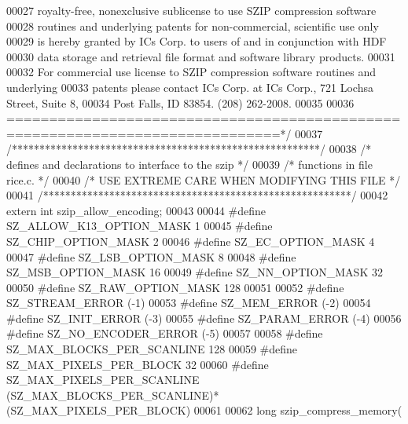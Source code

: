 \begin{DoxyCode}
00027 \textcolor{comment}{royalty-free, nonexclusive sublicense to use SZIP compression software }
00028 \textcolor{comment}{routines and underlying patents for non-commercial, scientific use only }
00029 \textcolor{comment}{is hereby granted by ICs Corp. to users of and in conjunction with HDF }
00030 \textcolor{comment}{data storage and retrieval file format and software library products.}
00031 \textcolor{comment}{}
00032 \textcolor{comment}{For commercial use license to SZIP compression software routines and underlying }
00033 \textcolor{comment}{patents please contact ICs Corp. at ICs Corp., 721 Lochsa Street, Suite 8,}
00034 \textcolor{comment}{Post Falls, ID 83854.  (208) 262-2008.}
00035 \textcolor{comment}{}
00036 \textcolor{comment}{==============================================================================*/}
00037 \textcolor{comment}{/********************************************************/}
00038 \textcolor{comment}{/* defines and declarations to interface to the szip    */}
00039 \textcolor{comment}{/* functions in file rice.c.                            */}
00040 \textcolor{comment}{/* USE EXTREME CARE WHEN MODIFYING THIS FILE            */}
00041 \textcolor{comment}{/********************************************************/}
00042 \textcolor{keyword}{extern} \textcolor{keywordtype}{int} szip\_allow\_encoding;
00043 
00044 \textcolor{preprocessor}{#define SZ\_ALLOW\_K13\_OPTION\_MASK         1}
00045 \textcolor{preprocessor}{#define SZ\_CHIP\_OPTION\_MASK              2 }
00046 \textcolor{preprocessor}{#define SZ\_EC\_OPTION\_MASK                4}
00047 \textcolor{preprocessor}{#define SZ\_LSB\_OPTION\_MASK               8}
00048 \textcolor{preprocessor}{#define SZ\_MSB\_OPTION\_MASK              16}
00049 \textcolor{preprocessor}{#define SZ\_NN\_OPTION\_MASK               32}
00050 \textcolor{preprocessor}{#define SZ\_RAW\_OPTION\_MASK             128}
00051 
00052 \textcolor{preprocessor}{#define SZ\_STREAM\_ERROR     (-1)}
00053 \textcolor{preprocessor}{#define SZ\_MEM\_ERROR        (-2)}
00054 \textcolor{preprocessor}{#define SZ\_INIT\_ERROR       (-3)}
00055 \textcolor{preprocessor}{#define SZ\_PARAM\_ERROR      (-4)}
00056 \textcolor{preprocessor}{#define SZ\_NO\_ENCODER\_ERROR (-5)}
00057 
00058 \textcolor{preprocessor}{#define SZ\_MAX\_BLOCKS\_PER\_SCANLINE            128}
00059 \textcolor{preprocessor}{#define SZ\_MAX\_PIXELS\_PER\_BLOCK                32}
00060 \textcolor{preprocessor}{#define SZ\_MAX\_PIXELS\_PER\_SCANLINE     (SZ\_MAX\_BLOCKS\_PER\_SCANLINE)*(SZ\_MAX\_PIXELS\_PER\_BLOCK)}
00061 
00062 \textcolor{keywordtype}{long} szip\_compress\_memory(

\end{DoxyCode}
